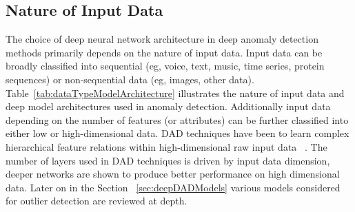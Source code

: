 \subsection{ Nature of Input Data}
The choice of deep neural network architecture in deep anomaly detection methods primarily depends on the nature of input data. Input data can be broadly classified into sequential (eg, voice, text, music, time series, protein sequences) or non-sequential data (eg, images, other data). Table~\ref{tab:dataTypeModelArchitecture} illustrates the nature of input data and deep model architectures used in anomaly detection. Additionally input data depending on the number of features (or attributes) can be further classified into either low or high-dimensional data. DAD techniques have been to learn complex hierarchical feature relations within high-dimensional raw input data ~\cite{lecun2015deep}. The number of layers used in DAD techniques is driven by input data dimension, deeper networks are shown to produce better performance on high dimensional data. Later on in the Section ~\ref{sec:deepDADModels}  various models considered for outlier detection are reviewed at depth.
